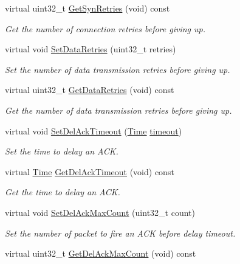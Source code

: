 \begin{DoxyCompactItemize}
virtual uint32\+\_\+t \hyperlink{classns3_1_1TcpSocketBase_aa27e11abd33d64abce31784cc0685bc0}{Get\+Syn\+Retries} (void) const 
\begin{DoxyCompactList}\small\item\em Get the number of connection retries before giving up. \end{DoxyCompactList}\item 
virtual void \hyperlink{classns3_1_1TcpSocketBase_a6a29b086aee1d5cec7eee34a6d3e9621}{Set\+Data\+Retries} (uint32\+\_\+t retries)
\begin{DoxyCompactList}\small\item\em Set the number of data transmission retries before giving up. \end{DoxyCompactList}\item 
virtual uint32\+\_\+t \hyperlink{classns3_1_1TcpSocketBase_ae6bc66f86e59e933d9681561e18774ce}{Get\+Data\+Retries} (void) const 
\begin{DoxyCompactList}\small\item\em Get the number of data transmission retries before giving up. \end{DoxyCompactList}\item 
virtual void \hyperlink{classns3_1_1TcpSocketBase_a2c23d993022a027c7377c14b790433d6}{Set\+Del\+Ack\+Timeout} (\hyperlink{classns3_1_1Time}{Time} \hyperlink{openflow-switch_8cc_a386d174ae121d1cfa279074b7e209714}{timeout})
\begin{DoxyCompactList}\small\item\em Set the time to delay an A\+CK. \end{DoxyCompactList}\item 
virtual \hyperlink{classns3_1_1Time}{Time} \hyperlink{classns3_1_1TcpSocketBase_a82c0837e768770ca28cb95f70af0a1dc}{Get\+Del\+Ack\+Timeout} (void) const 
\begin{DoxyCompactList}\small\item\em Get the time to delay an A\+CK. \end{DoxyCompactList}\item 
virtual void \hyperlink{classns3_1_1TcpSocketBase_aac71f522f7742d83a71d39dfebf76188}{Set\+Del\+Ack\+Max\+Count} (uint32\+\_\+t count)
\begin{DoxyCompactList}\small\item\em Set the number of packet to fire an A\+CK before delay timeout. \end{DoxyCompactList}\item 
virtual uint32\+\_\+t \hyperlink{classns3_1_1TcpSocketBase_a807fa9a8f8d4faeb78f34dab8cd112d2}{Get\+Del\+Ack\+Max\+Count} (void) const 

\end{DoxyCompactItemize}
